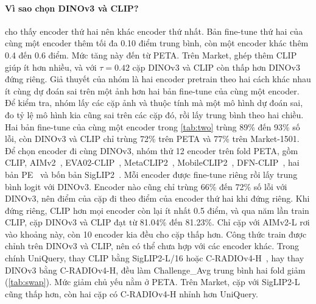 \documentclass[10pt,twocolumn,letterpaper]{article}
\begin{document}
\paragraph{Vì sao chọn DINOv3 và CLIP?}  cho thấy encoder thứ hai nên khác encoder thứ nhất. Bản fine-tune thứ hai của cùng một encoder thêm tối đa 0.10 điểm trung bình, còn một encoder khác thêm 0.4 đến 0.6 điểm. Mức tăng này đến từ PETA. Trên Market, ghép thêm CLIP giúp ít hơn nhiều, và với $\tau=0.42$ cặp DINOv3 và CLIP còn thấp hơn DINOv3 đứng riêng. Giả thuyết của nhóm là hai encoder pretrain theo hai cách khác nhau ít cùng dự đoán sai trên một ảnh hơn hai bản fine-tune của cùng một encoder. Để kiểm tra, nhóm lấy các cặp ảnh và thuộc tính mà một mô hình dự đoán sai, đo tỷ lệ mô hình kia cũng sai trên các cặp đó, rồi lấy trung bình theo hai chiều. Hai bản fine-tune của cùng một encoder trong \cref{tab:two} trùng 89\% đến 93\% số lỗi, còn DINOv3 và CLIP chỉ trùng 72\% trên PETA và 77\% trên Market-1501. Để chọn encoder đi cùng DINOv3, nhóm thử 12 encoder trên fold PETA, gồm CLIP, AIMv2~\cite{aimv2}, EVA02-CLIP~\cite{evaclip}, MetaCLIP2~\cite{metaclip2}, MobileCLIP2~\cite{mobileclip2}, DFN-CLIP~\cite{dfn}, hai bản PE~\cite{pe} và bốn bản SigLIP2~\cite{siglip2}. Mỗi encoder được fine-tune riêng rồi lấy trung bình logit với DINOv3. Encoder nào cũng chỉ trùng 66\% đến 72\% số lỗi với DINOv3, nên điểm của cặp đi theo điểm của encoder thứ hai khi đứng riêng. Khi đứng riêng, CLIP hơn mọi encoder còn lại ít nhất 0.5 điểm, và qua năm lần train CLIP, cặp DINOv3 và CLIP đạt từ 81.04\% đến 81.23\%. Chỉ cặp với AIMv2-L rơi vào khoảng này, còn 10 encoder kia đều cho cặp thấp hơn. Công thức train được chỉnh trên DINOv3 và CLIP, nên có thể chưa hợp với các encoder khác. Trong chính UniQuery, thay CLIP bằng SigLIP2-L/16 hoặc C-RADIOv4-H~\cite{cradio4}, hay thay DINOv3 bằng C-RADIOv4-H, đều làm Challenge\_Avg trung bình hai fold giảm (\cref{tab:swap}). Mức giảm chủ yếu nằm ở PETA. Trên Market, cặp với SigLIP2-L cũng thấp hơn, còn hai cặp có C-RADIOv4-H nhỉnh hơn UniQuery.
\end{document}
